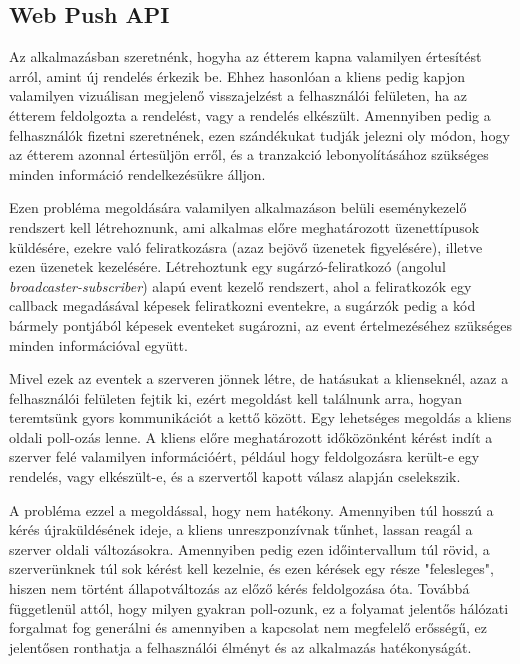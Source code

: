 \subsection{Web Push API}

Az alkalmazásban szeretnénk, hogyha az étterem kapna valamilyen értesítést arról, amint új rendelés érkezik be. Ehhez hasonlóan a kliens pedig kapjon valamilyen vizuálisan megjelenő visszajelzést a felhasználói felületen, ha az étterem feldolgozta a rendelést, vagy a rendelés elkészült. Amennyiben pedig a felhasználók fizetni szeretnének, ezen szándékukat tudják jelezni oly módon, hogy az étterem azonnal értesüljön erről, és a tranzakció lebonyolításához szükséges minden információ rendelkezésükre álljon. \par

Ezen probléma megoldására valamilyen alkalmazáson belüli eseménykezelő rendszert kell létrehoznunk, ami alkalmas előre meghatározott üzenettípusok küldésére, ezekre való feliratkozásra (azaz bejövő üzenetek figyelésére), illetve ezen üzenetek kezelésére. Létrehoztunk egy sugárzó-feliratkozó (angolul \emph{broadcaster-subscriber}) alapú event kezelő rendszert, ahol a feliratkozók egy callback megadásával képesek feliratkozni eventekre, a sugárzók pedig a kód bármely pontjából képesek eventeket sugározni, az event értelmezéséhez szükséges minden információval együtt. \par

Mivel ezek az eventek a szerveren jönnek létre, de hatásukat a klienseknél, azaz a felhasználói felületen fejtik ki, ezért megoldást kell találnunk arra, hogyan teremtsünk gyors kommunikációt a kettő között. Egy lehetséges megoldás a kliens oldali poll-ozás lenne. A kliens előre meghatározott időközönként kérést indít a szerver felé valamilyen információért, például hogy feldolgozásra került-e egy rendelés, vagy elkészült-e, és a szervertől kapott válasz alapján cselekszik.

A probléma ezzel a megoldással, hogy nem hatékony. Amennyiben túl hosszú a kérés újraküldésének ideje, a kliens unreszponzívnak tűnhet, lassan reagál a szerver oldali változásokra. Amennyiben pedig ezen időintervallum túl rövid, a szerverünknek túl sok kérést kell kezelnie, és ezen kérések egy része "felesleges", hiszen nem történt állapotváltozás az előző kérés feldolgozása óta. Továbbá függetlenül attól, hogy milyen gyakran poll-ozunk, ez a folyamat jelentős hálózati forgalmat fog generálni és amennyiben a kapcsolat nem megfelelő erősségű, ez jelentősen ronthatja a felhasználói élményt és az alkalmazás hatékonyságát. \par

